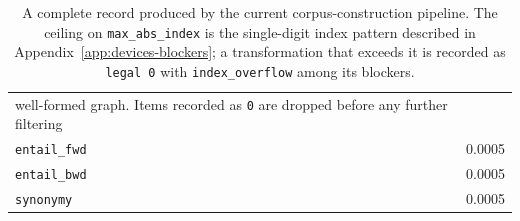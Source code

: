 \documentclass{article}
\begin{document}
\begin{table}[ht]
\begin{tabular}{@{}lp{}@{}}
                               well-formed graph. Items recorded as \texttt{0}
                               are dropped before any further filtering \\
\texttt{entail\_fwd}         & 0.0005 \\
\texttt{entail\_bwd}         & 0.0005 \\
\texttt{synonymy}            & 0.0005 \\
\bottomrule
\end{tabular}
\caption{A complete record produced by the current corpus-construction
pipeline. The ceiling on \texttt{max\_abs\_index} is the single-digit index
pattern described in Appendix~\ref{app:devices-blockers}; a transformation
that exceeds it is recorded as \texttt{legal 0} with
\texttt{index\_overflow} among its blockers.}
\label{tab:worked-record}
\end{table}
\end{document}
